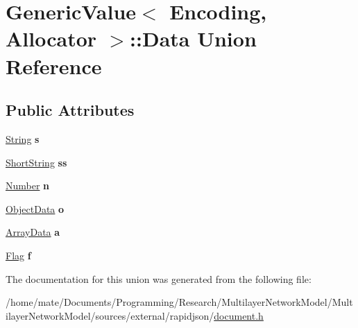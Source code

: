 \hypertarget{unionGenericValue_1_1Data}{}\section{Generic\+Value$<$ Encoding, Allocator $>$\+:\+:Data Union Reference}
\label{unionGenericValue_1_1Data}
\subsection*{Public Attributes}
\begin{DoxyCompactItemize}
\item 
\hyperlink{structGenericValue_1_1String}{String} {\bfseries s}\hypertarget{unionGenericValue_1_1Data_a6872a4b93763944063b425e6c001ed2b}{}\label{unionGenericValue_1_1Data_a6872a4b93763944063b425e6c001ed2b}

\item 
\hyperlink{structGenericValue_1_1ShortString}{Short\+String} {\bfseries ss}\hypertarget{unionGenericValue_1_1Data_a410e39a5dc296eb3b152b54193740e4c}{}\label{unionGenericValue_1_1Data_a410e39a5dc296eb3b152b54193740e4c}

\item 
\hyperlink{unionGenericValue_1_1Number}{Number} {\bfseries n}\hypertarget{unionGenericValue_1_1Data_a243007cce2f4b75bea3e3c1ee4c3c239}{}\label{unionGenericValue_1_1Data_a243007cce2f4b75bea3e3c1ee4c3c239}

\item 
\hyperlink{structGenericValue_1_1ObjectData}{Object\+Data} {\bfseries o}\hypertarget{unionGenericValue_1_1Data_af6417eca530fba0d8bd65d309628eb11}{}\label{unionGenericValue_1_1Data_af6417eca530fba0d8bd65d309628eb11}

\item 
\hyperlink{structGenericValue_1_1ArrayData}{Array\+Data} {\bfseries a}\hypertarget{unionGenericValue_1_1Data_aeac31cf55bf5a024cead5ecb63e4fd48}{}\label{unionGenericValue_1_1Data_aeac31cf55bf5a024cead5ecb63e4fd48}

\item 
\hyperlink{structGenericValue_1_1Flag}{Flag} {\bfseries f}\hypertarget{unionGenericValue_1_1Data_ad8572112da083c775ce21bcbca96b2ab}{}\label{unionGenericValue_1_1Data_ad8572112da083c775ce21bcbca96b2ab}

\end{DoxyCompactItemize}


The documentation for this union was generated from the following file\+:\begin{DoxyCompactItemize}
\item 
/home/mate/\+Documents/\+Programming/\+Research/\+Multilayer\+Network\+Model/\+Multilayer\+Network\+Model/sources/external/rapidjson/\hyperlink{document_8h}{document.\+h}\end{DoxyCompactItemize}
